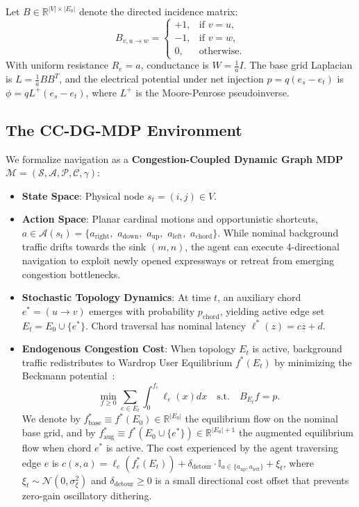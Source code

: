 \documentclass[11pt,a4paper]{article}
\begin{document}
Let $B \in \mathbb{R}^{|V| \times |E_0|}$ denote the directed incidence matrix:
\begin{equation}
B_{v, u \to w} = 
\begin{cases}
+1, & \text{if } v = u, \\
-1, & \text{if } v = w, \\
0, & \text{otherwise.}
\end{cases}
\end{equation}
With uniform resistance $R_e = a$, conductance is $W = \frac{1}{a} I$. The base grid Laplacian is $L = \frac{1}{a} B B^T$, and the electrical potential under net injection $p = q (e_s - e_t)$ is $\phi = q L^+ (e_s - e_t)$, where $L^+$ is the Moore-Penrose pseudoinverse.

\subsection{The CC-DG-MDP Environment}
We formalize navigation as a \textbf{Congestion-Coupled Dynamic Graph MDP} $\mathcal{M} = (\mathcal{S}, \mathcal{A}, \mathcal{P}, \mathcal{C}, \gamma)$:
\begin{itemize}
    \item \textbf{State Space}: Physical node $s_t = (i, j) \in V$.
    \item \textbf{Action Space}: Planar cardinal motions and opportunistic shortcuts, $a \in \mathcal{A}(s_t) = \{a_{\text{right}},$ $a_{\text{down}},$ $a_{\text{up}},$ $a_{\text{left}},$ $a_{\text{chord}}\}$. While nominal background traffic drifts towards the sink $(m, n)$, the agent can execute 4-directional navigation to exploit newly opened expressways or retreat from emerging congestion bottlenecks.
    \item \textbf{Stochastic Topology Dynamics}: At time $t$, an auxiliary chord $e^* = (u \to v)$ emerges with probability $p_{\text{chord}}$, yielding active edge set $E_t = E_0 \cup \{e^*\}$. Chord traversal has nominal latency $\ell^*(z) = c z + d$.
    \item \textbf{Endogenous Congestion Cost}: When topology $E_t$ is active, background traffic redistributes to Wardrop User Equilibrium $f^*(E_t)$ by minimizing the Beckmann potential~\cite{beckmann1956studies}:
    \begin{equation}
    \label{eq:beckmann}
    \min_{f \ge 0} \sum_{e \in E_t} \int_0^{f_e} \ell_e(x) dx \quad \text{s.t.} \quad B_{E_t} f = p.
    \end{equation}
    We denote by $f_{\text{base}}^* \equiv f^*(E_0) \in \mathbb{R}^{|E_0|}$ the equilibrium flow on the nominal base grid, and by $f_{\text{aug}}^* \equiv f^*(E_0 \cup \{e^*\}) \in \mathbb{R}^{|E_0|+1}$ the augmented equilibrium flow when chord $e^*$ is active. The cost experienced by the agent traversing edge $e$ is $c(s, a) = \ell_e(f_e^*(E_t)) + \delta_{\text{detour}} \cdot \mathbb{I}_{a \in \{a_{\text{up}}, a_{\text{left}}\}} + \xi_t$, where $\xi_t \sim \mathcal{N}(0, \sigma_{\xi}^2)$ and $\delta_{\text{detour}} \ge 0$ is a small directional cost offset that prevents zero-gain oscillatory dithering.
\end{itemize}
\end{document}
